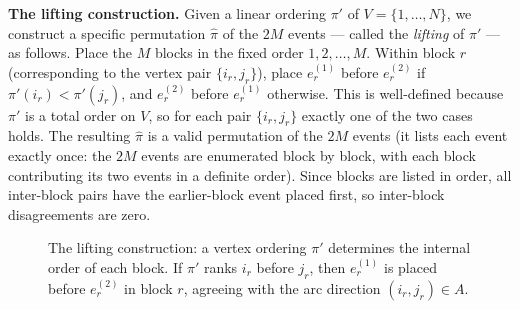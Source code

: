 \documentclass[11pt]{article}
\begin{document}
\smallskip
\noindent\textbf{The lifting construction.}
Given a linear ordering $\pi'$ of $V = \{1, \ldots, N\}$, we construct a specific permutation $\hat{\pi}$ of the $2M$ events --- called the \emph{lifting} of $\pi'$ --- as follows. Place the $M$ blocks in the fixed order $1, 2, \ldots, M$. Within block $r$ (corresponding to the vertex pair $\{i_r, j_r\}$), place $e_r^{(1)}$ before $e_r^{(2)}$ if $\pi'(i_r) < \pi'(j_r)$, and $e_r^{(2)}$ before $e_r^{(1)}$ otherwise. This is well-defined because $\pi'$ is a total order on $V$, so for each pair $\{i_r, j_r\}$ exactly one of the two cases holds. The resulting $\hat{\pi}$ is a valid permutation of the $2M$ events (it lists each event exactly once: the $2M$ events are enumerated block by block, with each block contributing its two events in a definite order). Since blocks are listed in order, all inter-block pairs have the earlier-block event placed first, so inter-block disagreements are zero.

\begin{figure}[ht]
\centering
{}
\caption{The lifting construction: a vertex ordering $\pi'$ determines the internal order of each block. If $\pi'$ ranks $i_r$ before $j_r$, then $e_r^{(1)}$ is placed before $e_r^{(2)}$ in block $r$, agreeing with the arc direction $(i_r, j_r) \in A$.}
\label{fig:lifting}
\end{figure}
\end{document}
